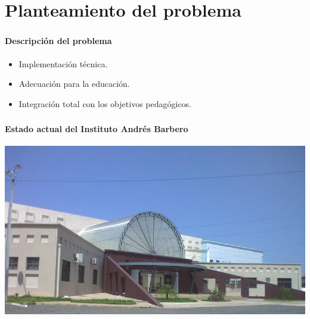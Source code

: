 \section{Planteamiento del problema}
\setcounter{sectiontotal}{4}

\begin{frame}
\frametitle{\pagetitle}
\framesubtitle{Descripción del problema}



\pause{}
\begin{itemize}[<+->]
    \item Implementación técnica.
    \item Adecuación para la educación.
    \item Integración total con los objetivos pedagógicos.
\end{itemize}

\end{frame}

\begin{frame}
\frametitle{\pagetitle}
\framesubtitle{Estado actual del Instituto Andrés Barbero}

\includegraphics[width=\textwidth]{imagenes/iab.jpg} 

\end{frame}

